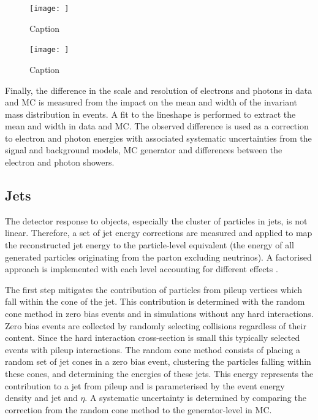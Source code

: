 \begin{figure}[htbp]
    \centering
    \texttt{[image: ]}
    \caption{Caption}
    \label{fig:electron-reco-efficiency}
\end{figure}

\begin{figure}[htbp]
    \centering
    \texttt{[image: ]}
    \caption{Caption}
    \label{fig:photon-trackveto-efficiency}
\end{figure}

Finally, the difference in the scale and resolution of electrons and photons
in data and MC is measured from the impact on the mean and width of the
invariant mass distribution in \IDYee events. A fit to the \PZ lineshape is
performed to extract the mean and width in data and MC. The observed
difference is used as a correction to electron and photon energies with
associated systematic uncertainties from the signal and background models, MC
generator and differences between the electron and photon showers.



\subsection{Jets}

The detector response to objects, especially the cluster of particles in jets,
is not linear. Therefore, a set of jet energy corrections are measured and
applied to map the reconstructed jet energy to the particle-level equivalent
(the energy of all generated particles originating from the parton excluding
neutrinos). A factorised approach is implemented with each level accounting
for different effects \cite{Khachatryan:2016kdb}.

The first step mitigates the contribution of particles from pileup vertices
which fall within the cone of the jet. This contribution is determined with
the random cone method in zero bias events and in simulations without any hard
interactions. Zero bias events are collected by randomly selecting collisions
regardless of their content. Since the hard interaction cross-section is small
this typically selected events with pileup interactions. The random cone
method consists of placing a random set of jet cones in a zero bias event,
clustering the particles falling within these cones, and determining the
energies of these jets. This energy represents the contribution to a jet from
pileup and is parameterised by the event energy density and jet \pt and
$\eta$. A systematic uncertainty is determined by comparing the correction
from the random cone method to the generator-level in MC.

